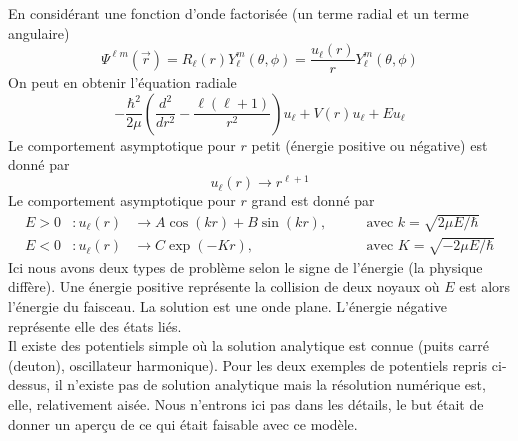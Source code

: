 \newpage
En considérant une fonction d'onde factorisée (un terme radial et un terme angulaire)
\begin{equation}
\Psi^{\ell m}(\vec{r}) = R_\ell(r)Y_\ell^m(\theta,\phi) = \frac{u_\ell(r)}{r}Y_\ell^m(\theta,\phi)
\end{equation}
On peut en obtenir l'équation radiale
\begin{equation}
-\frac{\hbar^2}{2\mu}\left(\frac{d^2}{dr^2}-\frac{\ell(\ell+1)}{r^2}\right)u_\ell + V(r)u_\ell + Eu_\ell
\end{equation}
Le comportement asymptotique pour $r$ petit (énergie positive ou négative) est donné par
\begin{equation}
u_\ell(r) \to r^{\ell+1}
\end{equation}
Le comportement asymptotique pour $r$ grand est donné par
\begin{equation}
\begin{array}{llll}
E > 0 &: u_\ell(r) &\to A\cos(kr)+B\sin(kr),&\qquad\text{avec } k=\sqrt{2\mu E/\hbar}\\
E < 0 &: u_\ell(r) &\to C\exp(-Kr),&\qquad\text{avec } K=\sqrt{-2\mu E/\hbar}
\end{array}
\end{equation}
Ici nous avons deux types de problème selon le signe de l'énergie (la physique diffère). Une énergie positive
représente la collision de deux noyaux où $E$ est alors l'énergie du faisceau. La solution est une onde plane.
L'énergie négative représente elle des états liés.\\

Il existe des potentiels simple où la solution analytique est connue (puits carré (deuton), oscillateur 
harmonique). Pour les deux exemples de potentiels repris ci-dessus, il n'existe pas de solution analytique
mais la résolution numérique est, elle, relativement aisée. Nous n'entrons ici pas dans les détails, le but était
de donner un aperçu de ce qui était faisable avec ce modèle.